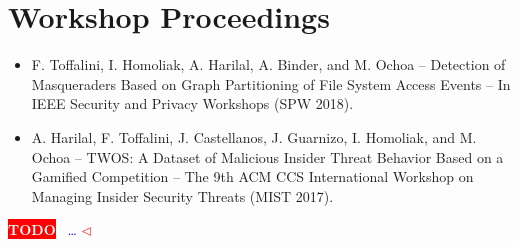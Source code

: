 \documentclass[
11pt, %
oneside, %
english, %
singlespacing, %
headsepline, %
]{MastersDoctoralThesis} %
\newcommand{\todobox}[3]{%
	\colorbox{#1}{\textcolor{white}{\sffamily\bfseries\scriptsize #2}}%
	~\textcolor{blue}{#3} %
	\textcolor{#1}{$\triangleleft$}%
}
\newcommand{\todo}[1]{\todobox{red}{TODO}{#1}}
\begin{document}
\begin{publications}
\begin{itemize}
\end{itemize}

\section*{Workshop Proceedings}
\begin{itemize}
	
	\item F. Toffalini, I. Homoliak, A. Harilal, A. Binder, and M. Ochoa --  
	Detection of Masqueraders Based on Graph Partitioning of File System 
	Access Events -- In IEEE Security and Privacy Workshops (SPW 2018).
	
	\item A. Harilal, F. Toffalini, J. Castellanos, J. Guarnizo, I. Homoliak,  
	and M. Ochoa -- TWOS: A Dataset of Malicious Insider Threat Behavior Based 
	on a Gamified Competition -- The 9th ACM CCS International Workshop on 
	Managing Insider Security Threats (MIST 2017).	
\end{itemize}


\end{publications}


\begin{acknowledgements}
\addchaptertocentry{\acknowledgementname} %
\todo{\dots}
%
%
%
%
%


\end{acknowledgements}
\end{document}
